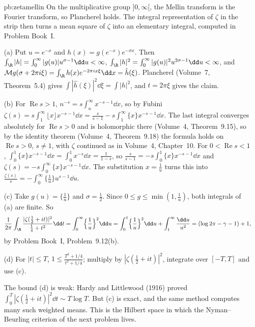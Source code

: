 \begin{solution}{pb:zetamellin}
\idea On the multiplicative group $]0,\infty[$, the Mellin transform is the Fourier transform, so Plancherel holds. The integral representation of $\zeta$ in the strip
then turns a mean square of $\zeta$ into an elementary integral, computed in Problem Book~I.

\writeup (a) Put $u=e^{-x}$ and $h(x)=g(e^{-x})e^{-\sigma x}$. Then $\int_\R|h|=\int_0^\infty|g(u)|u^{\sigma-1}\dd u<\infty$, $\int_\R|h|^2=\int_0^\infty|g(u)|^2u^{2\sigma-1}\dd u<\infty$, and
$\mathcal Mg(\sigma+2\pi i\xi)=\int_\R h(x)e^{-2\pi ix\xi}\dd x=\hat h(\xi)$. Plancherel (Volume~7, Theorem~5.4) gives $\int|\hat h(\xi)|^2\dd\xi=\int|h|^2$, and $t=2\pi\xi$ gives the claim.

(b) For $\operatorname{Re}s>1$, $n^{-s}=s\int_n^\infty x^{-s-1}\dd x$, so by Fubini $\zeta(s)=s\int_1^\infty\lfloor x\rfloor x^{-s-1}\dd x=\frac s{s-1}-s\int_1^\infty\{x\}x^{-s-1}\dd x$.
The last integral converges absolutely for $\operatorname{Re}s>0$ and is holomorphic there (Volume~4, Theorem~9.15), so by the identity theorem (Volume~4, Theorem~9.18) the formula holds on
$\operatorname{Re}s>0$, $s\ne1$, with $\zeta$ continued as in Volume~4, Chapter~10. For $0<\operatorname{Re}s<1$, $\int_0^1\{x\}x^{-s-1}\dd x=\int_0^1x^{-s}\dd x=\frac1{1-s}$, so
$\frac s{s-1}=-s\int_0^1\{x\}x^{-s-1}\dd x$ and $\zeta(s)=-s\int_0^\infty\{x\}x^{-s-1}\dd x$. The substitution $x=\frac1u$ turns this into $\frac{\zeta(s)}s=-\int_0^\infty\{\frac1u\}u^{s-1}\dd u$.

(c) Take $g(u)=\{\frac1u\}$ and $\sigma=\frac12$. Since $0\le g\le\min(1,\frac1u)$, both integrals of (a) are finite. So
\[
\frac1{2\pi}\int_\R\frac{|\zeta(\frac12+it)|^2}{\frac14+t^2}\dd t=\int_0^\infty\Bigl\{\frac1u\Bigr\}^2\dd u=\int_0^1\Bigl\{\frac1u\Bigr\}^2\dd u+\int_1^\infty\frac{\dd u}{u^2}=(\log2\pi-\gamma-1)+1,
\]
by Problem Book~I, Problem~9.12(b).

(d) For $|t|\le T$, $1\le\frac{T^2+1/4}{t^2+1/4}$; multiply by $|\zeta(\frac12+it)|^2$, integrate over $[-T,T]$ and use (c).

\leads The bound (d) is weak: Hardy and Littlewood (1916) proved $\int_0^T|\zeta(\frac12+it)|^2\dd t\sim T\log T$. But (c) is exact, and the same method computes many such weighted means.
This is the Hilbert space in which the Nyman--Beurling criterion of the next problem lives.
\end{solution}

